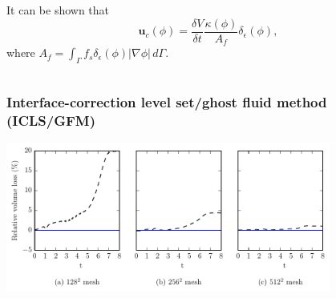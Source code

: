 \begin{frame}[t]
\begin{columns}[T]
\begin{column}{0.5\textwidth}
{\begin{bluecolorbox}
        It can be shown that
        \begin{equation}
          {\bm u}_c(\phi) = \frac{\delta V}{\delta t} \frac{\kappa(\phi)}{A_f} \delta_\epsilon (\phi),
        \end{equation}
        where $A_f = \int_\Gamma f_s \delta_\epsilon (\phi)|\nabla \phi| \,d\Gamma$.
        
      \end{bluecolorbox}
      } %
    \end{column}
    
  \end{columns}

\end{frame}
\begin{frame}[noframenumbering]
  \frametitle{Interface-correction level set/ghost fluid method (ICLS/GFM)}

  \centering
  \includegraphics[width=0.8\textwidth]{../paper1/Figures/serp_loss.pdf}
  \vskip0.3cm

\end{frame}
